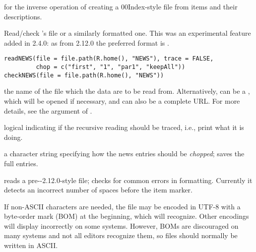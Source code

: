 %
\begin{SeeAlso}\relax
{} for the inverse operation of creating a
00Index-style file from items and their descriptions.
\end{SeeAlso}
%
\begin{Description}\relax
Read/check \R{}'s  file or a similarly formatted one.
This was an experimental feature added in \R{} 2.4.0: as from
\R{} 2.12.0 the preferred format is .
\end{Description}
%
\begin{Usage}
\begin{verbatim}
readNEWS(file = file.path(R.home(), "NEWS"), trace = FALSE,
         chop = c("first", "1", "par1", "keepAll"))
checkNEWS(file = file.path(R.home(), "NEWS"))
\end{verbatim}
\end{Usage}
%
\begin{Arguments}
\begin{ldescription}
\item[\code{file}] the name of the file which the data are to be read from.
Alternatively,  can be a , which
will be opened if necessary, and can also be a complete URL.  For
more details, see the  argument of .
\item[\code{trace}] logical indicating if the recursive reading should be
traced, i.e., print what it is doing.
\item[\code{chop}] a character string specifying how the news entries should
be \emph{chopped};  saves the full entries.
\end{ldescription}
\end{Arguments}
%
\begin{Details}\relax
{} reads a pre-\R{}-2.12.0-style  file;
 checks for common errors in formatting.  Currently it
detects an incorrect number of spaces before the  item marker.

If non-ASCII characters are needed, the  file may be encoded in
UTF-8 with a byte-order mark (BOM) at the beginning, which
 will recognize.  Other encodings will display
incorrectly on some systems.  However, BOMs are discouraged on many
systems and not all editors recognize them, so  files should
normally be written in ASCII.
\end{Details}
